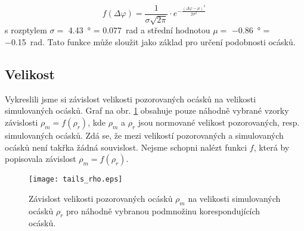 \begin{equation}
f(\Delta\varphi) = \frac{1}{\sigma\sqrt{2\pi}}\cdot e^{-\frac{\left(\Delta\varphi - \mu\right)^2}{2\sigma^2}}\, 
\end{equation}
s rozptylem $\sigma =  $ \SI{4.43}{\degree} = \SI{0.077}{\radian} a střední hodnotou $\mu = $ \SI{-0.86}{\degree} = \SI{-0.15}{\radian}. Tato funkce může sloužit jako základ pro určení podobnosti ocásků.   

\subsection{Velikost}
	Vykreslili jsme si závislost velikosti pozorovaných ocásků na velikosti simulovaných ocásků. Graf na obr. \ref{fig: tail_depend2} obsahuje pouze náhodně vybrané vzorky závislosti $\rho_m = f(\rho_r)$, kde $\rho_m$ a $\rho_r$ jsou normované velikost pozorovaných, resp. simulovaných ocásků. Zdá se, že mezi velikostí pozorovaných a simulovaných ocásků není takřka žádná souvislost. Nejsme schopni nalézt funkci $f$, která by popisovala závislost $\rho_m = f(\rho_r)$.
	
	\begin{figure}[htps]
\centering
\texttt{[image: tails\_rho.eps]}
\caption[Závislost velikosti simulovaných a pozorovaných ocásků.]{Závislost velikosti pozorovaných ocásků $\rho_m$  na velikosti  simulovaných ocásků $\rho_r$ pro náhodně vybranou podmnožinu korespondujících ocásků.}
\label{fig: tail_depend2}
\end{figure}

\clearpage
